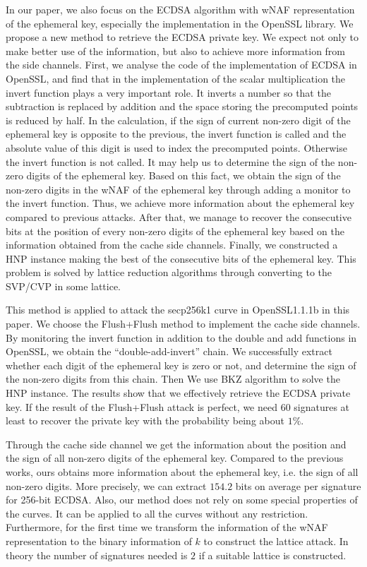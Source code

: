 In our paper, we also focus on the ECDSA algorithm with wNAF representation of the ephemeral key, especially the implementation in the OpenSSL library.
 We propose a new method to retrieve the ECDSA private key.
We expect not only to make better use of the information,
  but also to achieve more information from the side channels.
First, we analyse the code of the implementation of ECDSA in OpenSSL,
 and find that
in the implementation of the scalar multiplication the invert function plays a very important role.
It inverts a number so that the subtraction is replaced by addition and the space storing the precomputed points is reduced by half.
In the calculation, if the sign of current non-zero digit of the ephemeral key is opposite to the previous, the invert function is called  and the absolute value of this digit is used to index the precomputed points. Otherwise the invert function is not called.
It may help us to determine the sign of the non-zero digits of the ephemeral key.
  Based on this fact, we obtain the sign of the non-zero digits in the wNAF of the ephemeral key through adding a monitor to the invert function.
 Thus, we achieve more information about the ephemeral key compared to previous attacks.
After that, we manage to recover the consecutive bits at the position of every non-zero digits of the ephemeral key based on the information obtained from the cache side channels.
Finally, we constructed a HNP \cite{boneh1996} instance making the best of the consecutive bits of the ephemeral key.
This problem is solved by lattice reduction algorithms  through converting to the SVP/CVP in some lattice.

This method is applied to attack the secp256k1 curve in OpenSSL1.1.1b in this paper.
We choose the Flush+Flush\cite{gruss2016flush} method to implement the cache side channels.
By monitoring the  invert function
	in addition to the double and add functions in OpenSSL,
	we obtain the ``double-add-invert'' chain.
We successfully extract whether each digit of the ephemeral key is zero or not, and determine the sign of the non-zero digits from this chain.
Then We use BKZ \cite{Schnorr1994} algorithm to solve the HNP instance.
The results show that we effectively retrieve the ECDSA private key.
If the result of the Flush+Flush attack is perfect, we need $60$ signatures at least to recover the private key with the probability being about $1\%$.

Through the cache side channel we get the information about the position and the sign of all non-zero digits of the ephemeral key.
Compared to the previous works, ours obtains more information about the ephemeral key, i.e. the sign of all non-zero digits.
 More precisely, we can extract $154.2$ bits on average per signature for 256-bit ECDSA.
Also, our method does not rely on some special properties of the curves.
It  can be applied to all the curves without any restriction.
Furthermore,  for the first time we transform the information of the wNAF representation to the binary information of $k$ to construct the lattice attack.
In theory the number of signatures needed is $2$ if a suitable lattice is constructed.




